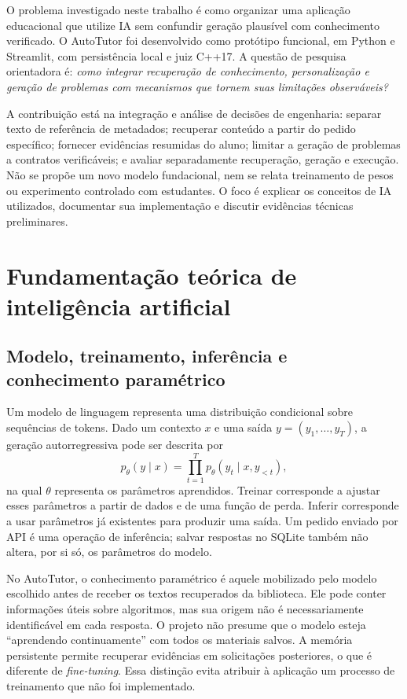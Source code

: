 \documentclass[12pt]{article}
\begin{document}
O problema investigado neste trabalho é como organizar uma aplicação educacional que utilize IA sem confundir geração plausível com conhecimento verificado. O AutoTutor foi desenvolvido como protótipo funcional, em Python e Streamlit, com persistência local e juiz C++17. A questão de pesquisa orientadora é: \emph{como integrar recuperação de conhecimento, personalização e geração de problemas com mecanismos que tornem suas limitações observáveis?}

A contribuição está na integração e análise de decisões de engenharia: separar texto de referência de metadados; recuperar conteúdo a partir do pedido específico; fornecer evidências resumidas do aluno; limitar a geração de problemas a contratos verificáveis; e avaliar separadamente recuperação, geração e execução. Não se propõe um novo modelo fundacional, nem se relata treinamento de pesos ou experimento controlado com estudantes. O foco é explicar os conceitos de IA utilizados, documentar sua implementação e discutir evidências técnicas preliminares.

\section{Fundamentação teórica de inteligência artificial}
\subsection{Modelo, treinamento, inferência e conhecimento paramétrico}
Um modelo de linguagem representa uma distribuição condicional sobre sequências de tokens. Dado um contexto $x$ e uma saída $y=(y_1,\ldots,y_T)$, a geração autorregressiva pode ser descrita por
\begin{equation}
 p_\theta(y\mid x)=\prod_{t=1}^{T}p_\theta(y_t\mid x,y_{<t}),
\end{equation}
na qual $\theta$ representa os parâmetros aprendidos. Treinar corresponde a ajustar esses parâmetros a partir de dados e de uma função de perda. Inferir corresponde a usar parâmetros já existentes para produzir uma saída. Um pedido enviado por API é uma operação de inferência; salvar respostas no SQLite também não altera, por si só, os parâmetros do modelo.

No AutoTutor, o conhecimento paramétrico é aquele mobilizado pelo modelo escolhido antes de receber os textos recuperados da biblioteca. Ele pode conter informações úteis sobre algoritmos, mas sua origem não é necessariamente identificável em cada resposta. O projeto não presume que o modelo esteja ``aprendendo continuamente'' com todos os materiais salvos. A memória persistente permite recuperar evidências em solicitações posteriores, o que é diferente de \emph{fine-tuning}. Essa distinção evita atribuir à aplicação um processo de treinamento que não foi implementado.
\end{document}

